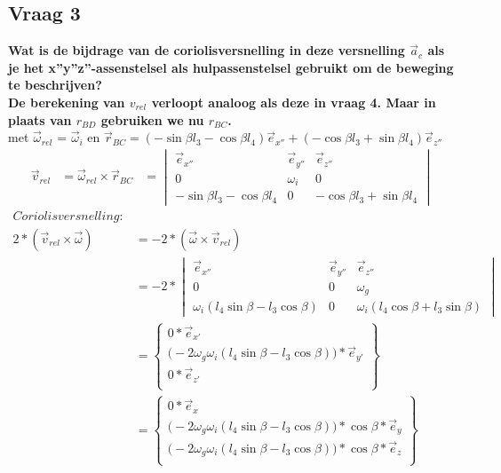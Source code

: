 \documentclass[a4paper,10pt]{article}
\begin{document}
\subsection{Vraag 3}
\textbf{Wat is de bijdrage van de coriolisversnelling in deze versnelling $\vec{a}_c$ als je het x”y”z”-assenstelsel als hulpassenstelsel gebruikt om de beweging te beschrijven?}\\
\textbf{De berekening van $v_{rel}$ verloopt analoog als deze in vraag 4. Maar in plaats van $r_{BD}$ gebruiken we nu $r_{BC}$.}\\
met $\vec{\omega}_{rel}$ = $\vec{\omega}_i$ en $\vec{r}_{BC} = (-\sin{\beta}l_3 - \cos{\beta} l_4)\vec{e}_{x''} + (-\cos{\beta} l_3 + \sin{\beta}l_4)\vec{e}_{z''}$
\begin{equation}
\begin{aligned}
\vec{v}_{rel} &= \vec{\omega}_{rel} \times \vec{r}_{BC}
&=\begin{vmatrix}
\vec{e}_{x''} & \vec{e}_{y''} & \vec{e}_{z''}\\
0 & \omega_i & 0\\
-\sin{\beta}l_3 - \cos{\beta} l_4 & 0 &-\cos{\beta} l_3 + \sin{\beta} l_4
\end{vmatrix}
\end{aligned}
\end{equation}
\begin{equation}
\begin{aligned}
	Coriolisversnelling:\\ 2*( \vec{v}_{rel} \times  \vec{\omega}) &= -2 *( \vec{\omega} \times \vec{v}_{rel})\\
	&=-2 * \begin{vmatrix}
	\vec{e}_{x''} & \vec{e}_{y''} & \vec{e}_{z''}\\
	0 & 0 & \omega_g \\
	\omega_i  (l_4 \sin{\beta}-l_3  \cos{\beta}) & 0 & \omega_i (l_4\cos{\beta} + l_3  \sin{\beta})
	\end{vmatrix}\\
	&=  \begin{Bmatrix}
	0 * \vec{e}_{x'}\\
	\Big(-2\omega_g\omega_i(l_4 \sin{\beta}-l_3  \cos{\beta})\Big)*\vec{e}_{y'}\\
	0 * \vec{e}_{z'}\\
	\end{Bmatrix}\\
	&= \begin{Bmatrix}
		0 * \vec{e}_{x}\\
		\Big(-2\omega_g\omega_i(l_4 \sin{\beta}-l_3  \cos{\beta})\Big)*\cos{\beta}*\vec{e}_{y}\\
		\Big(-2\omega_g\omega_i(l_4 \sin{\beta}-l_3  \cos{\beta})\Big)*\cos{\beta} * \vec{e}_{z}\\
	\end{Bmatrix}
\end{aligned}
\end{equation}
\end{document}
